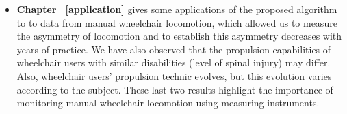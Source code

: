 \begin{itemize}
\item \textbf{Chapter \, \ref{application}} gives some applications of the proposed algorithm to  to data from manual wheelchair locomotion, which allowed us to measure the asymmetry of locomotion and to establish this asymmetry decreases with years of practice. We have also observed that the propulsion capabilities of wheelchair users with similar disabilities (level of spinal injury) may differ. Also, wheelchair users' propulsion technic evolves, but this evolution varies according to the subject. These last two results highlight the importance of monitoring manual wheelchair locomotion using measuring instruments.  
\end{itemize}


